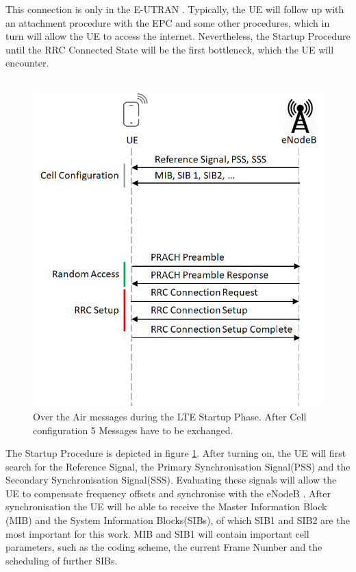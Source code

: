 \documentclass[conference]{IEEEtran}
\begin{document}
This connection is only in the E-UTRAN .
Typically, the UE will follow up with an attachment procedure with the EPC and some other procedures, which in turn will allow the UE to access the internet.
Nevertheless, the Startup Procedure until the RRC Connected State will be the first bottleneck, which the UE will encounter.\\\\
\begin{figure}
    \centering
    \includegraphics[width= \columnwidth]{Figures/OtA_LTE_Startup.png}
    \caption{Over the Air messages during the LTE Startup Phase. After Cell configuration 5 Messages have to be exchanged.}
    \label{fig:OtA_LTE_Startup}
\end{figure}
The Startup Procedure is depicted in figure \ref{fig:OtA_LTE_Startup}.
After turning on, the UE will first search for the Reference Signal, the Primary Synchronisation Signal(PSS) and the Secondary Synchronisation Signal(SSS).
Evaluating these signals will allow the UE to compensate frequency offsets and synchronise with the eNodeB .
After synchronisation the UE will be able to receive the Master Information Block (MIB) and the System Information Blocks(SIBs), of which SIB1 and SIB2 are the most important for this work.
MIB and SIB1 will contain important cell parameters, such as the coding scheme, the current Frame Number and the scheduling of further SIBs.\\\\
\end{document}
